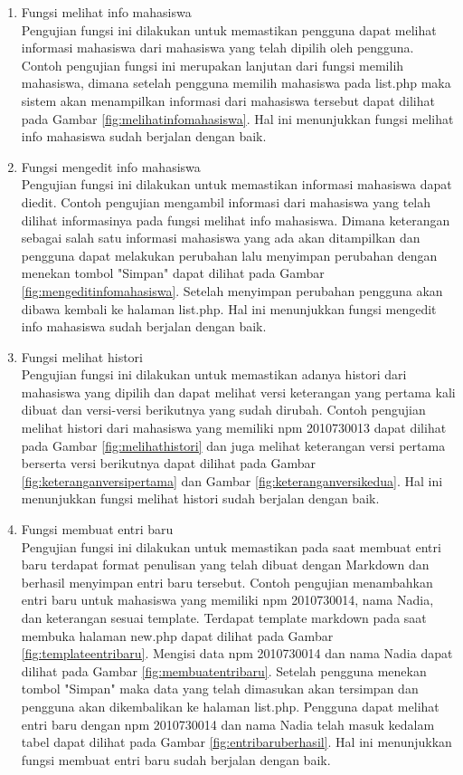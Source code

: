 \begin{enumerate}[(1)]
\item Fungsi melihat info mahasiswa\\
	Pengujian fungsi ini dilakukan untuk memastikan pengguna dapat melihat informasi mahasiswa dari mahasiswa yang telah dipilih oleh pengguna. Contoh pengujian fungsi ini merupakan lanjutan dari fungsi memilih mahasiswa, dimana setelah pengguna memilih mahasiswa pada list.php maka sistem akan menampilkan informasi dari mahasiswa tersebut dapat dilihat pada Gambar \ref{fig:melihatinfomahasiswa}. Hal ini menunjukkan fungsi melihat info mahasiswa sudah berjalan dengan baik.
	
\item Fungsi mengedit info mahasiswa\\
	Pengujian fungsi ini dilakukan untuk memastikan informasi mahasiswa dapat diedit. Contoh pengujian mengambil informasi dari mahasiswa yang telah dilihat informasinya pada fungsi melihat info mahasiswa. Dimana keterangan sebagai salah satu informasi mahasiswa yang ada akan ditampilkan dan pengguna dapat melakukan perubahan lalu menyimpan perubahan dengan menekan tombol "Simpan" dapat dilihat pada Gambar \ref{fig:mengeditinfomahasiswa}. Setelah menyimpan perubahan pengguna akan dibawa kembali ke halaman list.php. Hal ini menunjukkan fungsi mengedit info mahasiswa sudah berjalan dengan baik.
	
\item Fungsi melihat histori\\
	Pengujian fungsi ini dilakukan untuk memastikan adanya histori dari mahasiswa yang dipilih dan dapat melihat versi keterangan yang pertama kali dibuat dan versi-versi berikutnya yang sudah dirubah. Contoh pengujian melihat histori dari mahasiswa yang memiliki npm 2010730013 dapat dilihat pada Gambar \ref{fig:melihathistori} dan juga melihat keterangan versi pertama berserta versi berikutnya dapat dilihat pada Gambar \ref{fig:keteranganversipertama} dan Gambar \ref{fig:keteranganversikedua}. Hal ini menunjukkan fungsi melihat histori sudah berjalan dengan baik.
	
\item Fungsi membuat entri baru\\
	Pengujian fungsi ini dilakukan untuk memastikan pada saat membuat entri baru terdapat format penulisan yang telah dibuat dengan Markdown dan berhasil menyimpan entri baru tersebut. Contoh pengujian menambahkan entri baru untuk mahasiswa yang memiliki npm 2010730014, nama Nadia, dan keterangan sesuai template. Terdapat template markdown pada saat membuka halaman new.php dapat dilihat pada Gambar \ref{fig:templateentribaru}. Mengisi data npm 2010730014 dan nama Nadia dapat dilihat pada Gambar \ref{fig:membuatentribaru}. Setelah pengguna menekan tombol "Simpan" maka data yang telah dimasukan akan tersimpan dan pengguna akan dikembalikan ke halaman list.php. Pengguna dapat melihat entri baru dengan npm 2010730014 dan nama Nadia telah masuk kedalam tabel dapat dilihat pada Gambar \ref{fig:entribaruberhasil}. Hal ini menunjukkan fungsi membuat entri baru sudah berjalan dengan baik.
	

\end{enumerate}
